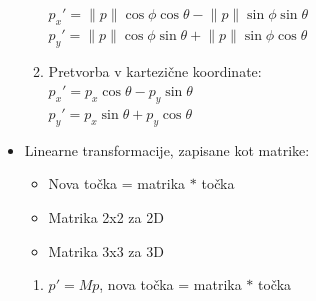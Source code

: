 \documentclass{article}
\begin{document}
\begin{itemize}
\begin{enumerate}
        $p_x' = \lVert p \rVert \cos{\phi} \cos{\theta} - \lVert p \rVert \sin{\phi} \sin{\theta}$ \\
        $p_y' = \lVert p \rVert \cos{\phi} \sin{\theta} + \lVert p \rVert \sin{\phi} \cos{\theta}$
        \item Pretvorba v kartezične koordinate: \\
        $p_x' = p_x \cos{\theta} - p_y \sin{\theta}$ \\
        $p_y' = p_x \sin{\theta} + p_y \cos{\theta}$
    \end{enumerate}
    \item Linearne transformacije, zapisane kot matrike:
    \begin{itemize}
        \item Nova točka = matrika $*$ točka
        \item Matrika 2x2 za 2D
        \item Matrika 3x3 za 3D
    \end{itemize}
    \begin{enumerate}
        \item $p' = Mp$, nova točka = matrika $*$ točka
    \end{enumerate}
\end{itemize}
\end{document}
